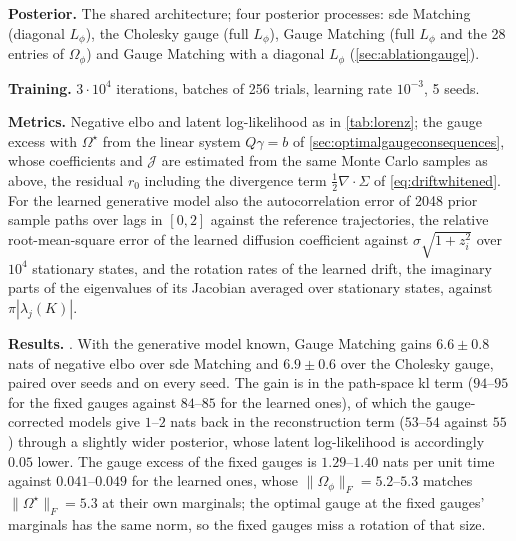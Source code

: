 \documentclass{article} %
\newcommand{\gauge}{\Omega}
\begin{document}
\textbf{Posterior.} The shared architecture; four posterior processes: \gls{sde} Matching (diagonal $L_\phi$), the Cholesky gauge (full $L_\phi$), Gauge Matching (full $L_\phi$ and the 28 entries of $\gauge_\phi$) and Gauge Matching with a diagonal $L_\phi$ (\cref{sec:ablationgauge}).

\textbf{Training.} $3 \cdot 10^4$ iterations, batches of 256 trials, learning rate $10^{-3}$, 5 seeds.

\textbf{Metrics.} Negative \gls{elbo} and latent log-likelihood as in \cref{tab:lorenz}; the gauge excess with $\gauge^\star$ from the linear system $Q \gamma = b$ of \cref{sec:optimalgaugeconsequences}, whose coefficients and $\mathcal{J}$ are estimated from the same Monte Carlo samples as above, the residual $r_0$ including the divergence term $\frac{1}{2} \nabla \cdot \Sigma$ of \cref{eq:driftwhitened}. For the learned generative model also the autocorrelation error of 2048 prior sample paths over lags in $[0, 2]$ against the reference trajectories, the relative root-mean-square error of the learned diffusion coefficient against $\sigma \sqrt{1 + z_i^2}$ over $10^4$ stationary states, and the rotation rates of the learned drift, the imaginary parts of the eigenvalues of its Jacobian averaged over stationary states, against $\pi |\lambda_j(K)|$.

\textbf{Results.} . With the generative model known, Gauge Matching gains $6.6 \pm 0.8$ nats of negative \gls{elbo} over \gls{sde} Matching and $6.9 \pm 0.6$ over the Cholesky gauge, paired over seeds and on every seed. The gain is in the path-space \gls{kl} term ($94$--$95$ for the fixed gauges against $84$--$85$ for the learned ones), of which the gauge-corrected models give $1$--$2$ nats back in the reconstruction term ($53$--$54$ against $55$) through a slightly wider posterior, whose latent log-likelihood is accordingly $0.05$ lower. The gauge excess of the fixed gauges is $1.29$--$1.40$ nats per unit time against $0.041$--$0.049$ for the learned ones, whose $\|\gauge_\phi\|_F = 5.2$--$5.3$ matches $\|\gauge^\star\|_F = 5.3$ at their own marginals; the optimal gauge at the fixed gauges' marginals has the same norm, so the fixed gauges miss a rotation of that size.
\end{document}
